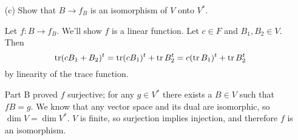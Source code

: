 \documentclass{article}
\begin{document}
\begin{enumerate}[listparindent=\parindent]
\begin{enumerate}[listparindent=\parindent]
\item[(c)] Show that \(B \rightarrow f_B\) is an isomorphism of \(V\) onto \(V^*\).

    Let \(f: B \rightarrow f_B\). We'll show \(f\) is a linear function.
    Let \(c \in F\) and \(B_1, B_2 \in V\). Then
    \[\operatorname{tr}(cB_1 + B_2)^t = \operatorname{tr}(cB_1)^t + \operatorname{tr} B_2^t = c(\operatorname{tr} B_1)^t + \operatorname{tr} B_2^t\]
    by linearity of the trace function.
    
    Part B proved \(f\) surjective; for any \(g \in V^*\) there exists a \(B \in V\) such that \(fB = g\).
    We know that any vector space and its dual are isomorphic, so \(\dim V = \dim V^*\).
    \(V\) is finite, so surjection implies injection, and therefore \(f\) is an isomorphism.

\end{enumerate}

\end{enumerate}
\end{document}
